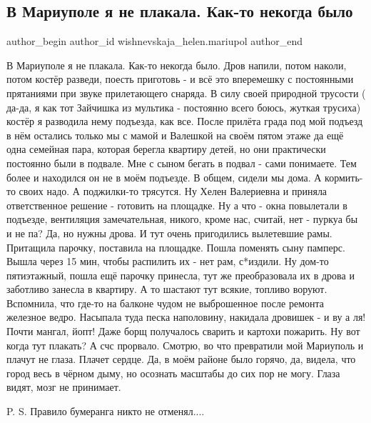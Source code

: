  
 
 
 
 

\subsection{В Мариуполе я не плакала. Как-то некогда было}
\label{sec:28_03_2022.fb.wishnevskaja_helen.mariupol.1.v_mariupole_ya_ne_pl}

\ifcmt
 author_begin
   author_id wishnevskaja_helen.mariupol
 author_end
\fi

В Мариуполе я не плакала. Как-то некогда было. Дров напили, потом наколи, потом
костёр разведи, поесть приготовь - и всё это вперемешку с постоянными
прятаниями при звуке прилетающего снаряда. В силу своей природной трусости (
да-да, я как тот Зайчишка из мультика - постоянно всего боюсь, жуткая трусиха)
костёр я разводила нему подъезда, как все. После прилёта града под мой подъезд
в нём остались только мы с мамой и Валешкой на своём пятом этаже да ещё одна
семейная пара, которая берегла квартиру детей, но они практически постоянно
были в подвале. Мне с сыном бегать в подвал - сами понимаете. Тем более и
находился он не в моём подъезде. В общем, сидели мы дома. А кормить-то своих
надо. А поджилки-то трясутся. Ну Хелен Валериевна и приняла ответственное
решение - готовить на площадке. Ну а что - окна повылетали в подъезде,
вентиляция замечательная, никого, кроме нас, считай, нет - пуркуа бы и не па?
Да, но нужны дрова. И тут очень пригодились вылетевшие рамы. Притащила парочку,
поставила на площадке. Пошла поменять сыну памперс. Вышла через 15 мин, чтобы
распилить их - нет рам, с*издили. Ну дом-то пятиэтажный, пошла ещё парочку
принесла, тут же преобразовала их в дрова и заботливо занесла в квартиру. А то
шастают тут всякие, топливо воруют. Вспомнила, что где-то на балконе чудом не
выброшенное после ремонта железное ведро. Насыпала туда песка наполовину,
накидала дровишек - и ву а ля! Почти мангал, йопт! Даже борщ получалось сварить
и картохи пожарить. Ну вот когда тут плакать? А счс прорвало. Смотрю, во что
превратили мой Мариуполь и плачут не глаза. Плачет сердце. Да, в моём районе
было горячо, да, видела, что город весь в чёрном дыму, но осознать масштабы до
сих пор не могу. Глаза видят, мозг не принимает. 

P. S. Правило бумеранга никто не отменял....

